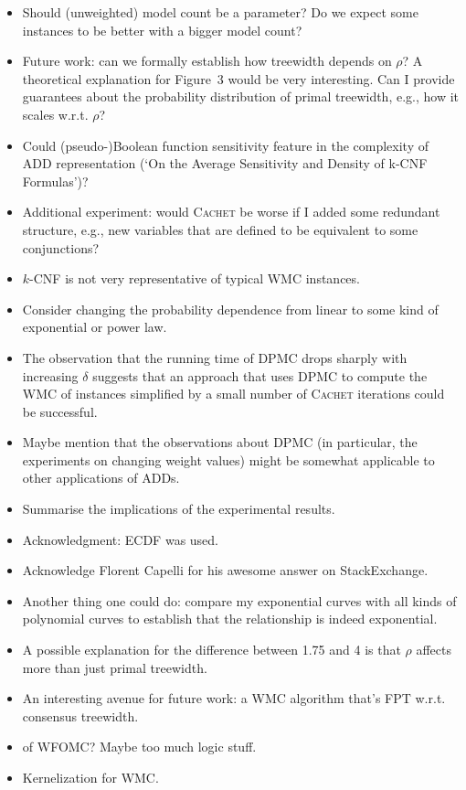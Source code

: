 \documentclass{article}
\theoremstyle{definition}
\theoremstyle{remark}
\begin{document}
\begin{itemize}
\item Should (unweighted) model count be a parameter? Do we expect some
  instances to be better with a bigger model count?
\item Future work: can we formally establish how treewidth depends on $\rho$? A
  theoretical explanation for Figure~3 would be very interesting. Can I provide
  guarantees about the probability distribution of primal treewidth, e.g., how
  it scales w.r.t. $\rho$?
\item Could (pseudo-)Boolean function sensitivity feature in the complexity of
  ADD representation (`On the Average Sensitivity and Density of k-CNF
  Formulas')?
\item Additional experiment: would \textsc{Cachet} be worse if I added
  some redundant structure, e.g., new variables that are defined to be
  equivalent to some conjunctions?
\item $k$-CNF is not very representative of typical \textsf{WMC} instances.
\item Consider changing the probability dependence from linear to some
  kind of exponential or power law.
\item The observation that the running time of \textsc{DPMC}
  \cite{DBLP:conf/cp/DudekPV20} drops sharply with increasing $\delta$ suggests
  that an approach that uses \textsc{DPMC} to compute the \textsf{WMC} of
  instances simplified by a small number of \textsc{Cachet} iterations could be
  successful.
\item Maybe mention that the observations about \textsc{DPMC} (in particular,
  the experiments on changing weight values) might be somewhat applicable to
  other applications of ADDs.
\item Summarise the implications of the experimental results.
\item Acknowledgment: ECDF was used.
\item Acknowledge Florent Capelli for his awesome answer on StackExchange.
\item Another thing one could do: compare my exponential curves with all kinds
  of polynomial curves to establish that the relationship is indeed exponential.
\item A possible explanation for the difference between 1.75 and 4 is that
  $\rho$ affects more than just primal treewidth.
\item An interesting avenue for future work: a \textsf{WMC} algorithm that's FPT
  w.r.t. consensus treewidth.
\item \FPT{} of \textsf{WFOMC}? Maybe too much logic stuff.
\item Kernelization for \textsf{WMC}.
\end{itemize}



\end{document}
